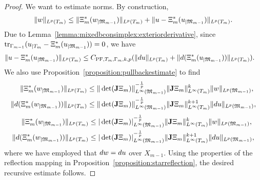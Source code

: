 \documentclass[10pt,a4paper]{article}
\begin{document}
\begin{proof}
    We want to estimate norms. 
    By construction,
    \begin{align*}
        \| w \|_{L^{p}(T_{m})}
        \leq  
        \| \Xi_{m}^{\ast}(w_{|{\mathfrak M}_{m-1}}) \|_{L^{p}(T_{m})}
        + 
        \| u - \Xi_{m}^{\ast}(u_{|{\mathfrak M}_{m-1}}) \|_{L^{p}(T_{m})}
        .
    \end{align*}
    Due to Lemma~\ref{lemma:mixedbconsimplex:exteriorderivative}, since $\operatorname{tr}_{\Gamma_{m-1}} (u_{|T_m} - \Xi_{m}^{\ast}(u_{|{\mathfrak M}_{m-1}})) = 0$, we have
    \begin{align*}
        \| u - \Xi_{m}^{\ast}(u_{|{\mathfrak M}_{m-1}}) \|_{L^{p}(T_{m})} 
        &
        \leq 
        C_{{\rm PF},T_{m},\Gamma_{m},k,p} (\| d u      \|_{L^{p}(T_{m})} 
        + \| d (\Xi_{m}^{\ast}(u_{|{\mathfrak M}_{m-1}})) \|_{L^{p}(T_{m})} )
        .
    \end{align*}
    We also use Proposition~\ref{proposition:pullbackestimate} to find 
    \begin{align*}
        \| \Xi_{m}^{\ast}(w_{|{\mathfrak M}_{m-1}}) \|_{L^{p}(T_{m})}
        &\leq 
        \|\det({\mathbf{J}} \Xi_{m}  )\|^{-\frac 1 p}_{L^{\infty}({\mathfrak M}_{m-1})} 
        \| {\mathbf{J}} \Xi_{m} \|^{k}_{L^{\infty}(T_{m})}
        \| w \|_{L^{p}({\mathfrak M}_{m-1})}
        ,
        \\
        \| d (\Xi_{m}^{\ast}(w_{|{\mathfrak M}_{m-1}})) \|_{L^{p}(T_{m})}
        &\leq 
        \|\det({\mathbf{J}} \Xi_{m}  )\|^{-\frac 1 p}_{L^{\infty}({\mathfrak M}_{m-1})} 
        \| {\mathbf{J}} \Xi_{m} \|^{k+1}_{L^{\infty}(T_{m})}
        \| d u \|_{L^{p}({\mathfrak M}_{m-1})}
        ,
    \end{align*}
	\begin{align*}
        \| \Xi_{m}^{\ast}(w_{|{\mathfrak M}_{m-1}}) \|_{L^{p}(T_{m})}
        &\leq 
        |\det({\mathbf{J}} \Xi_{m}  )|^{-\frac 1 p}_{L^{\infty}({\mathfrak M}_{m-1})} 
        \| {\mathbf{J}} \Xi_{m} \|^{k}_{L^{\infty}(T_{m})}
        \| w \|_{L^{p}({\mathfrak M}_{m-1})}
        ,
        \\
        \| d (\Xi_{m}^{\ast}(w_{|{\mathfrak M}_{m-1}})) \|_{L^{p}(T_{m})}
        &\leq 
        |\det({\mathbf{J}} \Xi_{m}  )|^{-\frac 1 p}_{L^{\infty}({\mathfrak M}_{m-1})} 
        \| {\mathbf{J}} \Xi_{m} \|^{k+1}_{L^{\infty}(T_{m})}
        \| d u \|_{L^{p}({\mathfrak M}_{m-1})}
        ,
    \end{align*}
    where we have employed that $d w = d u$ over $X_{m-1}$. 
    Using the properties of the reflection mapping in Proposition~\ref{proposition:starreflection}, the desired recursive estimate follows. 
\end{proof}
\end{document}
